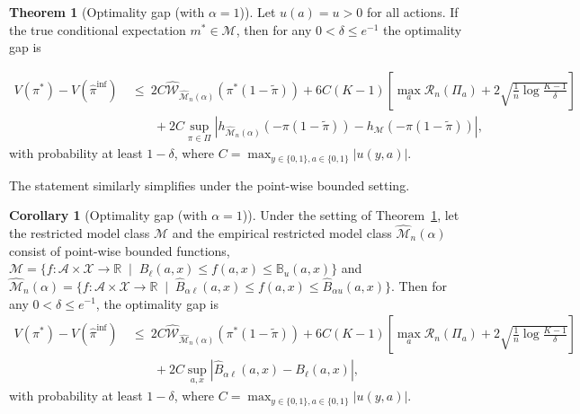 \documentclass[12pt]{article}
\theoremstyle{definition}
\newtheorem{theorem}{Theorem}
\newtheorem{corollary}{Corollary}
\newcommand{\R}{\ensuremath{\mathbb{R}}}
\newcommand{\B}{\ensuremath{\mathbb{B}}}
\newcommand{\<}{\langle}
\renewcommand{\>}{\rangle}
\newcommand\mcal[1]{\ensuremath{\mathcal{#1}}}
\begin{document}
\begin{theorem}[Optimality gap (with $\alpha = 1$)]
  \label{thm:emp_optimal_gap_full} \singlespacing
  Let $u(a) = u > 0$ for all actions.
  If the true conditional expectation $m^\ast \in \mcal{M}$, then for any $0 < \delta \leq e^{-1}$ the optimality gap is

  \begin{align*}
    V(\pi^\ast) - V(\hat{\pi}^\text{inf}) 
      & \ \leq \ 2C \widehat{\mcal{W}}_{\widehat{\mcal{M}}_n(\alpha)}\left(\pi^\ast (1 - \tilde{\pi})\right)   +6 C (K-1) \left[\max_{a} \mathcal{R}_n(\Pi_a) + 2\sqrt{\frac{1}{n}\log \frac{K-1}{\delta}} \right]\\
    & \qquad +2C\sup_{\pi \in \Pi} |h_{\widehat{\mathcal{M}}_n(\alpha)}\left(-\pi (1 - \tilde{\pi})\right) - h_\mathcal{\mathcal{M}}\left(-\pi (1 - \tilde{\pi})\right)|,
  \end{align*}
  with probability at least $1 - \delta$,
  where $C = \max_{y \in \{0,1\}, a \in \{0, 1\}} |u(y, a)|$.
\end{theorem}

The statement similarly simplifies under the point-wise bounded setting.
\begin{corollary}[Optimality gap (with $\alpha = 1$)]
  \label{cor:emp_optimal_gap_full_pointwise} \singlespacing
  Under the setting of Theorem~\ref{thm:emp_optimal_gap_full},
  let the restricted model class $\mathcal{M}$ and the empirical restricted model class  $\widehat{\mathcal{M}}_n(\alpha)$ consist of point-wise bounded functions,  $\mathcal{M} = \{f: \mathcal{A} \times \mcal{X} \to \R \; \mid \; B_{\ell}(a,x) \leq f(a, x) \leq \B_{u}(a, x)\}$ and  $\widehat{\mathcal{M}}_n(\alpha) = \{f: \mathcal{A} \times \mcal{X} \to \R \; \mid \; \widehat{B}_{\alpha\ell}(a,x) \leq f(a, x) \leq \widehat{B}_{\alpha u}(a, x)\}$.
  Then for any $0 < \delta \leq e^{-1}$, the optimality gap is
  \begin{align*}
    V(\pi^\ast) - V(\hat{\pi}^\text{inf}) 
      & \ \leq \ 2C \widehat{\mcal{W}}_{\widehat{\mcal{M}}_n(\alpha)}\left(\pi^\ast (1 - \tilde{\pi})\right)   +6 C (K-1) \left[\max_{a} \mathcal{R}_n(\Pi_a) + 2\sqrt{\frac{1}{n}\log \frac{K-1}{\delta}} \right]\\
    & \qquad + 2C\sup_{a, x}|\widehat{B}_{\alpha \ell}(a,x) - B_\ell(a, x)|,
  \end{align*}
  with probability at least $1 - \delta$,
  where $C = \max_{y \in \{0,1\}, a \in \{0, 1\}} |u(y, a)|$.
\end{corollary}
\end{document}
